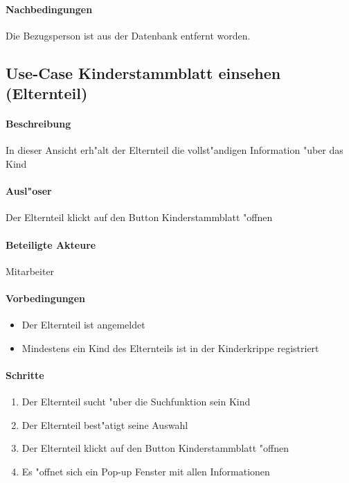 		\paragraph{Nachbedingungen}
		Die Bezugsperson ist aus der Datenbank entfernt worden. 
  
  
  
  \newpage
  \subsection{Use-Case Kinderstammblatt einsehen (Elternteil)}
  \paragraph{Beschreibung}
  In dieser Ansicht erh"alt der Elternteil die vollst"andigen Information "uber das Kind
  \paragraph{Ausl"oser}
  Der Elternteil klickt auf den Button \dq Kinderstammblatt "offnen\dq
  \paragraph{Beteiligte Akteure}   \leavevmode \newline
  Mitarbeiter
  \paragraph{Vorbedingungen}
  \begin{itemize}
  	\item Der Elternteil ist angemeldet
  	\item Mindestens ein Kind des Elternteils ist in der Kinderkrippe registriert 
  \end{itemize}
  
  \paragraph{Schritte}
  \begin{enumerate}
  	\item Der Elternteil sucht "uber die Suchfunktion sein Kind
  	\item Der Elternteil best"atigt seine Auswahl
  	\item Der Elternteil klickt auf den Button \dq Kinderstammblatt "offnen\dq
  	\item Es "offnet sich ein Pop-up Fenster mit allen Informationen
  \end{enumerate}
	
